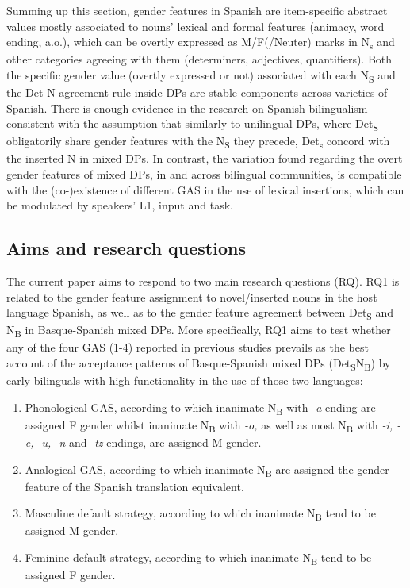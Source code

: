\documentclass[output=paper]{langscibook}
\begin{document}
Summing up this section, gender features in Spanish are item-specific abstract values mostly associated to nouns’ lexical and formal features (animacy, word ending, a.o.), which can be overtly expressed as M/F(/Neuter) marks in N\textsubscript{s} and other categories agreeing with them (determiners, adjectives, quantifiers). Both the specific gender value (overtly expressed or not) associated with each N\textsubscript{\MakeUppercase{s}} and the Det-N agreement rule inside DPs are stable components across varieties of Spanish. There is enough evidence in the research on Spanish bilingualism consistent with the assumption that similarly to unilingual DPs, where Det\textsubscript{S} obligatorily share gender features with the N\textsubscript{S} they precede, Det\textsubscript{s} concord with the inserted N in mixed DPs. In contrast, the variation found regarding the overt gender features of mixed DPs, in and across bilingual communities, is compatible with the (co-)existence of different GAS in the use of lexical insertions, which can be modulated by speakers’ L1, input and task.

\subsection{Aims and research questions}\label{sec:ezeiza:2.3}

The current paper aims to respond to two main research questions (RQ). RQ1 is related to the gender feature assignment to novel/inserted nouns in the host language Spanish, as well as to the gender feature agreement between Det\textsubscript{S} and N\textsubscript{B} in Basque-Spanish mixed DPs. More specifically, RQ1 aims to test whether any of the four GAS (1-4) reported in previous studies prevails as the best account of the acceptance patterns of Basque-Spanish mixed DPs (Det\textsubscript{S}N\textsubscript{B}) by early bilinguals with high functionality in the use of those two languages:

\begin{enumerate}
\item Phonological GAS, according to which inanimate N\textsubscript{B}  with \textit{-a} ending are assigned F gender whilst inanimate N\textsubscript{B} with \textit{-o,} as well as most N\textsubscript{B} with \textit{-i, -e, -u, -n} and \textit{-tz} endings, are assigned  M gender.
\item Analogical GAS, according to which inanimate N\textsubscript{B} are assigned the gender feature of the Spanish translation equivalent.
\item Masculine default strategy, according to which inanimate N\textsubscript{B} tend to be assigned M gender.
\item Feminine default strategy, according to which inanimate N\textsubscript{B} tend to be assigned F gender.
 \end{enumerate}
\end{document}
